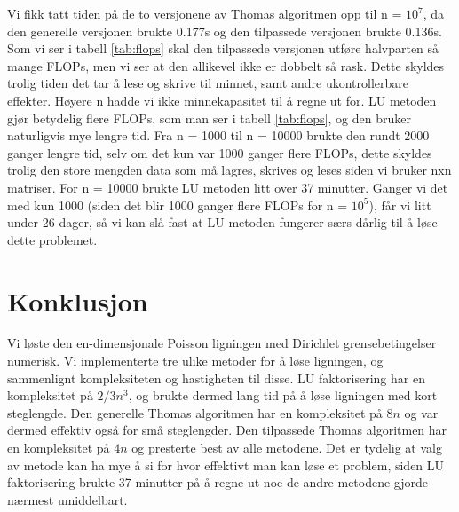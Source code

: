 \documentclass[reprint,english,notitlepage]{revtex4-1}
\begin{document}
	Vi fikk tatt tiden på de to versjonene av Thomas algoritmen opp til n = $10^7$, da den generelle versjonen brukte 0.177s og den tilpassede versjonen brukte 0.136s. Som vi ser i tabell \ref{tab:flops} skal den tilpassede versjonen utføre halvparten så mange FLOPs, men vi ser at den allikevel ikke er dobbelt så rask. Dette skyldes trolig tiden det tar å lese og skrive til minnet, samt andre ukontrollerbare effekter. Høyere n hadde vi ikke minnekapasitet til å regne ut for. LU metoden gjør betydelig flere FLOPs, som man ser i tabell \ref{tab:flops}, og den bruker naturligvis mye lengre tid. Fra n = 1000 til n = 10000 brukte den rundt 2000 ganger lengre tid, selv om det kun var 1000 ganger flere FLOPs, dette skyldes trolig den store mengden data som må lagres, skrives og leses siden vi bruker nxn matriser. For n = 10000 brukte LU metoden litt over 37 minutter. Ganger vi det med kun 1000 (siden det blir 1000 ganger flere FLOPs for n = $10^5$), får vi litt under 26 dager, så vi kan slå fast at LU metoden fungerer særs dårlig til å løse dette problemet.


\section{Konklusjon} %
	Vi løste den en-dimensjonale Poisson ligningen med Dirichlet grensebetingelser numerisk. Vi implementerte tre ulike metoder for å løse ligningen, og sammenlignt kompleksiteten og hastigheten til disse. LU faktorisering har en kompleksitet på $2/3n^3$, og brukte dermed lang tid på å løse ligningen med kort steglengde. Den generelle Thomas algoritmen har en kompleksitet på $8n$ og var dermed effektiv også for små steglengder. Den tilpassede Thomas algoritmen har en kompleksitet på $4n$ og presterte best av alle metodene. Det er tydelig at valg av metode kan ha mye å si for hvor effektivt man kan løse et problem, siden LU faktorisering brukte 37 minutter på å regne ut noe de andre metodene gjorde nærmest umiddelbart.

\begin{figure}  \end{figure}
	
\end{document}
